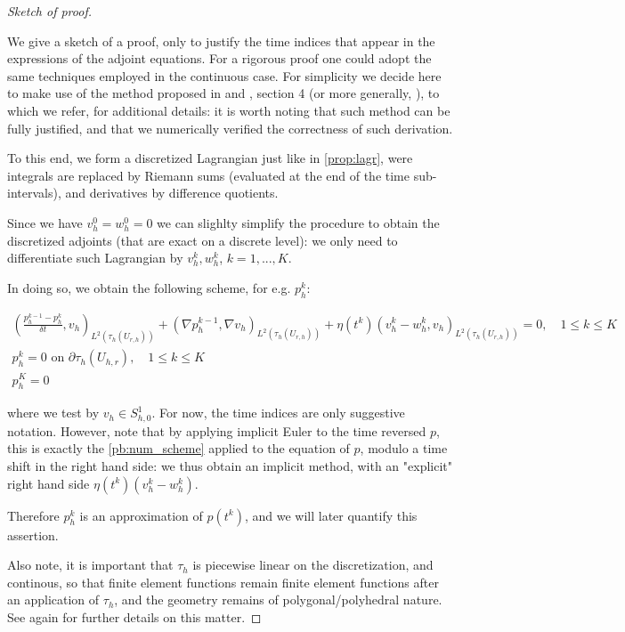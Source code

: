 \documentclass[english,a4paper,9pt,oneside]{scrbook}	%
\theoremstyle{break}
\newenvironment{mproof}[1][\proofname]{%
  \begin{proof}[#1]$ $\par\nobreak\ignorespaces
}{%
  \end{proof}
}
\renewcommand*{\proofname}{Proof}
\theoremstyle{remark}
\begin{document}
\begin{mproof}[Sketch of proof]

We give a sketch of a proof, only to justify the time indices that appear in the expressions of the adjoint equations. For a rigorous proof one could adopt the same techniques employed in the continuous case. For simplicity we decide here to make use of the method proposed in and \cite{lindemann2}, section 4 (or more generally, \cite{lindemann}), to which we refer, for additional details: it is worth noting that such method can be fully justified, and that we numerically verified the correctness of such derivation.

To this end, we form a discretized Lagrangian just like in \cref{prop:lagr}, were integrals are replaced by Riemann sums (evaluated at the end of the time sub-intervals), and derivatives by difference quotients.

Since we have $v_h^0=w_h^0=0$ we can slighlty simplify the procedure to obtain the discretized adjoints (that are exact on a discrete level): we only need to differentiate such Lagrangian by $v_h^k, w_h^k$, $k=1,...,K$. 

In doing so, we obtain the following scheme, for e.g. $p_h^k$:

\begin{align*}
	\left ( \frac{p_h^{k-1}-p_h^k}{\delta t}, v_h\right )_{L^2(\tau_h(U_{r,h}))} + (\nabla p_h^{k-1}, \nabla v_h )_{L^2(\tau_h(U_{r,h}))} + \eta(t^k)(v_h^k-w_h^k,v_h)_{L^2(\tau_h(U_{r,h}))} = 0, \quad 1\leq k \leq K\\
	p_h^k = 0 \text{ on } \partial \tau_h (U_{h,r}), \quad 1\leq k \leq K\\
	p_h^K=0 
\end{align*}

where we test by $v_h \in S^1_{h,0}$. For now, the time indices are only suggestive notation. However, note that by applying implicit Euler to the time reversed $p$, this is exactly the \cref{pb:num_scheme} applied to the equation of $p$, modulo a time shift in the right hand side: we thus obtain an implicit method, with an "explicit" right hand side $\eta(t^k)(v_h^k-w_h^k)$.

Therefore $p_h^k$ is an approximation of  $p(t^k)$, and we will later quantify this assertion.

Also note, it is important that $\tau_h$ is piecewise linear on the discretization, and continous, so that finite element functions remain finite element functions after an application of $\tau_h$, and the geometry remains of polygonal/polyhedral nature. See again \cite{lindemann2} for further details on this matter.
\end{mproof}
\end{document}
